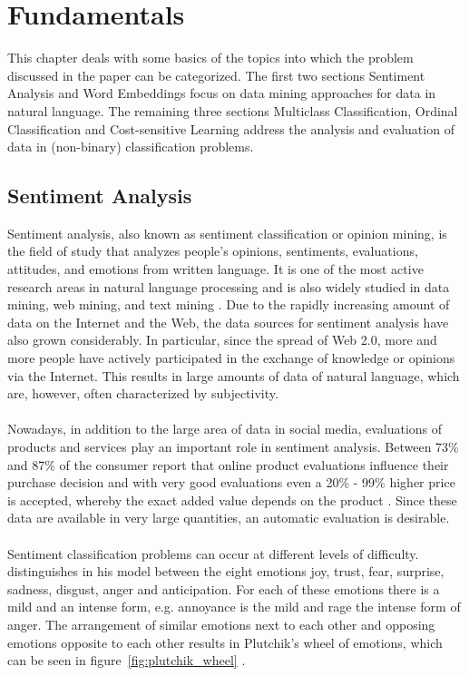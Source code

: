 \documentclass[article,type=msc,colorback,accentcolor=tud7b]{tudthesis}
\begin{document}
  \section{Fundamentals}
    This chapter deals with some basics of the topics into which the problem discussed in the paper can be categorized. The first two sections Sentiment Analysis and Word Embeddings focus on data mining approaches for data in natural language. The remaining three sections Multiclass Classification, Ordinal Classification and Cost-sensitive Learning address the analysis and evaluation of data in (non-binary) classification problems.
  
  \subsection{Sentiment Analysis}
    Sentiment analysis, also known as sentiment classification or opinion mining, is the field of study that analyzes people’s opinions, sentiments, evaluations, attitudes, and emotions from written language. It is one of the most active research areas in natural language processing and is also widely studied in data mining, web mining, and text mining \autocite{Liu2012}. Due to the rapidly increasing amount of data on the Internet and the Web, the data sources for sentiment analysis have also grown considerably. In particular, since the spread of Web 2.0, more and more people have actively participated in the exchange of knowledge or opinions via the Internet. This results in large amounts of data of natural language, which are, however, often characterized by subjectivity. \\\\
    Nowadays, in addition to the large area of data in social media, evaluations of products and services play an important role in sentiment analysis. Between 73\% and 87\% of the consumer report that online product evaluations influence their purchase decision and with very good evaluations even a 20\% - 99\% higher price is accepted, whereby the exact added value depends on the product \autocite[section~1.1]{Pang2008}. Since these data are available in very large quantities, an automatic evaluation is desirable. \\\\
    Sentiment classification problems can occur at different levels of difficulty. \citeauthor{Plutchik1980} distinguishes in his model between the eight emotions joy, trust, fear, surprise, sadness, disgust, anger and anticipation. For each of these emotions there is a mild and an intense form, e.g. annoyance is the mild and rage the intense form of anger. The arrangement of similar emotions next to each other and opposing emotions opposite to each other results in Plutchik's wheel of emotions, which can be seen in figure~\ref{fig:plutchik_wheel} \autocite{Plutchik1980}.  
  
\end{document}
